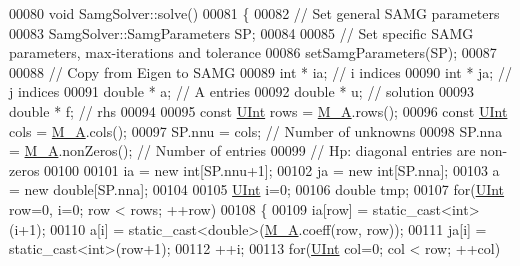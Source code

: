 \begin{DoxyCode}
00080 \textcolor{keywordtype}{void} SamgSolver::solve()
00081 \{
00082     \textcolor{comment}{// Set general SAMG parameters}
00083     SamgSolver::SamgParameters SP;
00084 
00085     \textcolor{comment}{// Set specific SAMG parameters, max-iterations and tolerance}
00086     setSamgParameters(SP);
00087 
00088     \textcolor{comment}{// Copy from Eigen to SAMG}
00089     \textcolor{keywordtype}{int} * ia;   \textcolor{comment}{// i indices}
00090     \textcolor{keywordtype}{int} * ja;   \textcolor{comment}{// j indices}
00091     \textcolor{keywordtype}{double} * a; \textcolor{comment}{// A entries}
00092     \textcolor{keywordtype}{double} * u; \textcolor{comment}{// solution}
00093     \textcolor{keywordtype}{double} * f; \textcolor{comment}{// rhs}
00094 
00095     \textcolor{keyword}{const} \hyperlink{namespaceFVCode3D_a4bf7e328c75d0fd504050d040ebe9eda}{UInt} rows = \hyperlink{classFVCode3D_1_1Solver_a7a7d556033c96bef473a2dc694af9036}{M\_A}.rows();
00096     \textcolor{keyword}{const} \hyperlink{namespaceFVCode3D_a4bf7e328c75d0fd504050d040ebe9eda}{UInt} cols = \hyperlink{classFVCode3D_1_1Solver_a7a7d556033c96bef473a2dc694af9036}{M\_A}.cols();
00097     SP.nnu     = cols;              \textcolor{comment}{// Number of unknowns}
00098     SP.nna     = \hyperlink{classFVCode3D_1_1Solver_a7a7d556033c96bef473a2dc694af9036}{M\_A}.nonZeros();    \textcolor{comment}{// Number of entries}
00099                                     \textcolor{comment}{// Hp: diagonal entries are non-zeros}
00100 
00101     ia = \textcolor{keyword}{new} \textcolor{keywordtype}{int}[SP.nnu+1];
00102     ja = \textcolor{keyword}{new} \textcolor{keywordtype}{int}[SP.nna];
00103     a  = \textcolor{keyword}{new} \textcolor{keywordtype}{double}[SP.nna];
00104 
00105     \hyperlink{namespaceFVCode3D_a4bf7e328c75d0fd504050d040ebe9eda}{UInt} i=0;
00106     \textcolor{keywordtype}{double} tmp;
00107     \textcolor{keywordflow}{for}(\hyperlink{namespaceFVCode3D_a4bf7e328c75d0fd504050d040ebe9eda}{UInt} row=0, i=0; row < rows; ++row)
00108     \{
00109         ia[row] = \textcolor{keyword}{static\_cast<}\textcolor{keywordtype}{int}\textcolor{keyword}{>}(i+1);
00110         a[i] = \textcolor{keyword}{static\_cast<}\textcolor{keywordtype}{double}\textcolor{keyword}{>}(\hyperlink{classFVCode3D_1_1Solver_a7a7d556033c96bef473a2dc694af9036}{M\_A}.coeff(row, row));
00111         ja[i] = \textcolor{keyword}{static\_cast<}\textcolor{keywordtype}{int}\textcolor{keyword}{>}(row+1);
00112         ++i;
00113         \textcolor{keywordflow}{for}(\hyperlink{namespaceFVCode3D_a4bf7e328c75d0fd504050d040ebe9eda}{UInt} col=0; col < row; ++col)

\end{DoxyCode}
